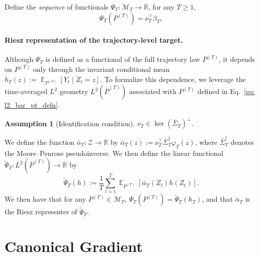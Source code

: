 \documentclass[11pt]{article}
\newtheorem{assum}{Assumption}
\DeclareMathOperator{\E}{\mathbb{E}}
\begin{document}
Define the \textit{sequence} of functionals $\Psi_T : \mathcal{M}_T \to \mathbb{R}$, for any $T \geq 1$, 
\begin{equation}
\label{eq:linear_target}
\Psi_T(P^{(T)}) = \nu_T^\top \beta_T, 
\end{equation}



\paragraph{Riesz representation of the trajectory-level target.}

Although $\Psi_T$ is defined as a functional of the full trajectory law $P^{(T)}$,
it depends on $P^{(T)}$ only through the invariant conditional mean
$h_T(z) := \E_{P^{(T)}}[Y_t \mid Z_t = z]$.
To formalize this dependence, we leverage the time-averaged $L^2$ geometry $L^2(\bar{P}^{(T)})$ associated with $P^{(T)}$ defined in Eq.~\eqref{eq: l2_bar_pt_defn}.


\begin{assum}[Identification condition]
\label{ass: source}
$\nu_T \in \ker(\bar\Sigma_T)^\perp$.
\end{assum}
We define the function
$\bar\alpha_T : \mathcal Z \to \mathbb R$ by $\bar\alpha_T(z) := \nu_T^\top \bar\Sigma_T^{\dagger} \varphi_T(z)$, 
where $\bar\Sigma_T^{\dagger}$ denotes the Moore--Penrose pseudoinverse. We then define the linear functional
$\widetilde\Psi_T : L^2(\bar P^{(T)}) \to \mathbb R$ by
\begin{equation}
\widetilde\Psi_T(h)
:= \frac{1}{T}\sum_{t=1}^T
\E_{P^{(T)}}\!\left[\bar\alpha_T(Z_t)h(Z_t)\right].    
\end{equation}
We then have that for any $P^{(T)} \in \mathcal{M}_T$, $\Psi_T(P^{(T)}) = \widetilde\Psi_T(h_T)$, and that $\bar \alpha_T$ is the Riesz representer of $\widetilde\Psi_T$.

\section{Canonical Gradient}
\label{sec:canonical_grad}
\end{document}
